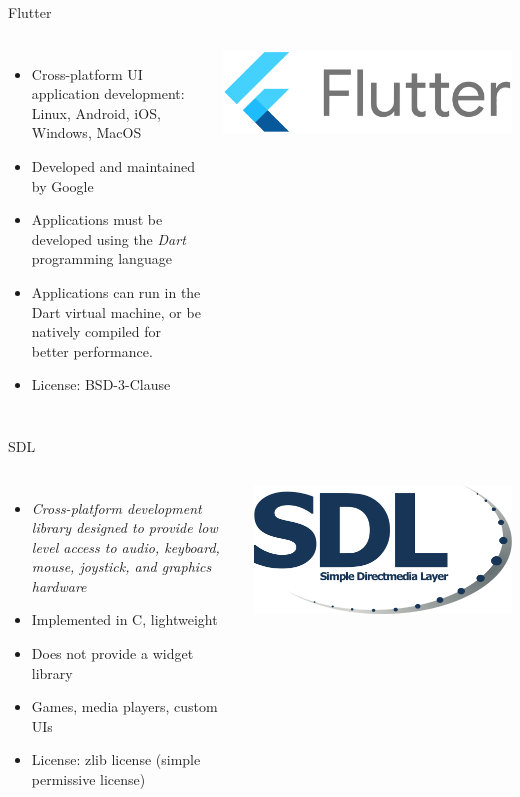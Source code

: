 \begin{frame}{Flutter}
  \begin{columns}
    \begin{itemize}
    \item Cross-platform UI application development: Linux, Android,
      iOS, Windows, MacOS
    \item Developed and maintained by Google
    \item Applications must be developed using the {\em Dart}
      programming language
    \item Applications can run in the Dart virtual machine, or be
      natively compiled for better performance.
    \item License: BSD-3-Clause
    \end{itemize}
    \includegraphics[width=\textwidth]{slides/sysdev-software-stacks/flutter-logo.png}
  \end{columns}
\end{frame}

\begin{frame}{SDL}
  \begin{columns}
    \begin{itemize}
    \item {\em Cross-platform development library designed to provide
        low level access to audio, keyboard, mouse, joystick, and
        graphics hardware}
    \item Implemented in C, lightweight
    \item Does not provide a widget library
    \item Games, media players, custom UIs
    \item License: zlib license (simple permissive license)
    \end{itemize}
    \includegraphics[width=\textwidth]{slides/sysdev-software-stacks/sdl-logo.png}
  \end{columns}
\end{frame}

